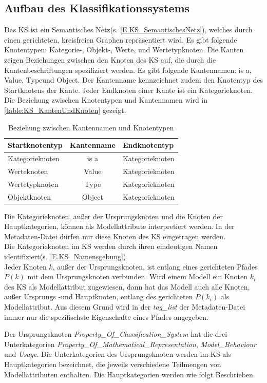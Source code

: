 \subsection{Aufbau des Klassifikationssystems}
\label{Ch:Ergebniss:Sec:KS:SubSec:Aufbau}
Das KS ist ein Semantisches Netz(s. \ref{E.KS_SemantischesNetz}), welches durch einen gerichteten, kreisfreien Graphen repräsentiert wird. Es gibt folgende Knotentypen: Kategorie-, Objekt-, Werte, und Wertetypknoten. 
Die Kanten zeigen Beziehungen zwischen den Knoten des KS auf, die durch die Kantenbeschriftungen spezifiziert werden. Es gibt folgende Kantennamen: \glqq is a\grqq, \glqq Value\grqq, \glqq Type\grqq und \glqq Object\grqq. Der Kantenname kennzeichnet zudem den Knotentyp des Startknotens der Kante. Jeder Endknoten einer Kante ist ein Kategorieknoten. Die Beziehung zwischen Knotentypen und Kantennamen wird in \autoref{table:KS_KantenUndKnoten} gezeigt.
\begin{table}[H]
	\centering
	\begin{tabular}{l|c|l}
		Startknotentyp & Kantenname & Endknotentyp \\ \hline
		Kategorieknoten & is a & Kategorieknoten \\
		Werteknoten & Value & Kategorieknoten \\
		Wertetypknoten & Type & Kategorieknoten \\
		Objektknoten & Object & Kategorieknoten
	\end{tabular}
	\caption{Beziehung zwischen Kantennamen und Knotentypen}
	\label{table:KS_KantenUndKnoten}
\end{table}

Die Kategorieknoten, außer der Ursprungsknoten und die Knoten der Hauptkategorien, können als Modellattribute interpretiert werden. In der Metadaten-Datei dürfen nur diese Knoten des KS eingetragen werden. \\
Die Kategorieknoten im KS werden durch ihren eindeutigen Namen identifiziert(s. \ref{E.KS_Namensgebung}).\\
Jeder Knoten $k$, außer der Ursprungsknoten, ist entlang eines gerichteten Pfades $P(k)$ mit dem Ursprungsknoten verbunden. Wird einem Modell ein Knoten $k_i$ des KS als Modellattribut zugewiesen, dann hat das Modell auch alle Knoten, außer Ursprungs -und Hauptknoten, entlang des gerichteten $P(k_i)$ als Modellattribut. Aus diesem Grund wird in der \textit{tag\_list} der Metadaten-Datei immer nur die spezifischste Eigenschafte eines Pfades angegeben. %

Der Ursprungsknoten \textit{Property\_Of\_Classification\_System} hat die drei Unterkategorien \textit{Property\_Of\_Mathematical\_Representation}, \textit{Model\_Behaviour} und \textit{Usage}. Die Unterkategorien des Ursprungsknoten werden im KS als Hauptkategorien bezeichnet, die jeweils verschiedene Teilmengen von Modellattributen enthalten. Die Hauptkategorien werden wie folgt Beschrieben.

